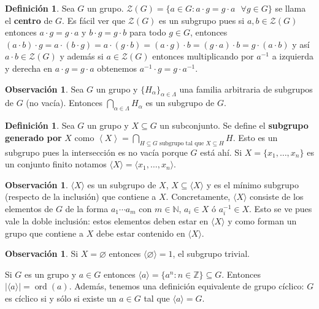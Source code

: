 \documentclass[12pt]{book}
\theoremstyle{definition}
\newtheorem{obs}[teo]{Observación}
\newtheorem{defn}[teo]{Definición}
\newcommand{\ZZ}{\mathbb{Z}}      %
\newcommand{\NN}{\mathbb{N}}
\let\emptyset\varnothing
\DeclareMathOperator{\ord}{ord}
\begin{document}
\begin{defn}
Sea $G$ un grupo. $\mathcal{Z}(G) = \{a\in G : a\cdot g = g\cdot a \text{ }\forall g\in G\}$ se llama el \textbf{centro} de $G$. Es fácil ver que $\mathcal{Z}(G)$ es un subgrupo pues si $a,b\in \mathcal{Z}(G)$ entonces $a\cdot g = g\cdot a$ y $b\cdot g = g\cdot b$ para todo $g\in G$, entonces $(a\cdot b) \cdot g = a\cdot (b\cdot g) = a\cdot (g\cdot b) = (a\cdot g)\cdot b = (g\cdot a)\cdot b = g\cdot (a\cdot b)$ y así $a\cdot b\in \mathcal{Z}(G)$ y además si $a\in \mathcal{Z}(G)$ entonces multiplicando por $a^{-1}$ a izquierda y derecha en $a\cdot g = g\cdot a$ obtenemos $a^{-1} \cdot g = g\cdot a^{-1}$.
\end{defn}

\begin{obs}
Sea $G$ un grupo y $\{H_\alpha\}_{\alpha \in \Lambda}$ una familia arbitraria de subgrupos de $G$ (no vacía). Entonces $\bigcap_{\alpha\in\Lambda}H_{\alpha}$ es un subgrupo de $G$.
\end{obs}

\begin{defn}
Sea $G$ un grupo y $X\subseteq G$ un subconjunto. Se define el \textbf{subgrupo generado por} $X$ como $\left\langle X\right\rangle = \bigcap_{H\subseteq G \text{ subgrupo tal que } X\subseteq H} H$. Esto es un subgrupo pues la intersección es no vacía porque $G$ está ahí. Si $X=\{x_1,\ldots ,x_n\}$ es un conjunto finito notamos $\langle X\rangle =\langle x_1,\ldots ,x_n\rangle$.
\end{defn}

\begin{obs}
$\langle X\rangle$ es un subgrupo de $X$, $X\subseteq \langle X\rangle$ y es el mínimo subgrupo (respecto de la inclusión) que contiene a $X$. Concretamente, $\langle X\rangle$ consiste de los elementos de $G$ de la forma $a_1\cdots a_m$ con $m\in\NN$, $a_i \in X$ ó $a_i^{-1}\in X$. Esto se ve pues vale la doble inclusión: estos elementos deben estar en $\langle X\rangle$ y como forman un grupo que contiene a $X$ debe estar contenido en $\langle X\rangle$.
\end{obs}
\begin{obs}
Si $X=\emptyset$ entonces $\langle \emptyset\rangle = 1$, el subgrupo trivial.
\end{obs}

Si $G$ es un grupo y $a\in G$ entonces $\langle a\rangle = \{a^n : n\in\ZZ\}\subseteq G$. Entonces $|\langle a\rangle| = \ord(a)$. Además, tenemos una definición equivalente de grupo cíclico: $G$ es cíclico si y sólo si existe un $a\in G$ tal que $\langle a\rangle = G$.
\end{document}
